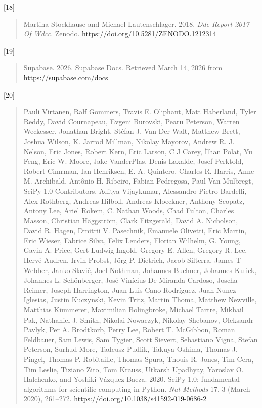 {[}18{]}

\begin{quote}
Martina Stockhause and Michael Lautenschlager. 2018. \emph{Ddc Report 2017 Of Wdcc}. Zenodo. \url{https://doi.org/10.5281/ZENODO.1212314}
\end{quote}

{[}19{]}

\begin{quote}
Supabase. 2026. Supabase Docs. Retrieved March 14, 2026 from \url{https://supabase.com/docs}
\end{quote}

{[}20{]}

\begin{quote}
Pauli Virtanen, Ralf Gommers, Travis E. Oliphant, Matt Haberland, Tyler Reddy, David Cournapeau, Evgeni Burovski, Pearu Peterson, Warren Weckesser, Jonathan Bright, Stéfan J. Van Der Walt, Matthew Brett, Joshua Wilson, K. Jarrod Millman, Nikolay Mayorov, Andrew R. J. Nelson, Eric Jones, Robert Kern, Eric Larson, C J Carey, İlhan Polat, Yu Feng, Eric W. Moore, Jake VanderPlas, Denis Laxalde, Josef Perktold, Robert Cimrman, Ian Henriksen, E. A. Quintero, Charles R. Harris, Anne M. Archibald, Antônio H. Ribeiro, Fabian Pedregosa, Paul Van Mulbregt, SciPy 1.0 Contributors, Aditya Vijaykumar, Alessandro Pietro Bardelli, Alex Rothberg, Andreas Hilboll, Andreas Kloeckner, Anthony Scopatz, Antony Lee, Ariel Rokem, C. Nathan Woods, Chad Fulton, Charles Masson, Christian Häggström, Clark Fitzgerald, David A. Nicholson, David R. Hagen, Dmitrii V. Pasechnik, Emanuele Olivetti, Eric Martin, Eric Wieser, Fabrice Silva, Felix Lenders, Florian Wilhelm, G. Young, Gavin A. Price, Gert-Ludwig Ingold, Gregory E. Allen, Gregory R. Lee, Hervé Audren, Irvin Probst, Jörg P. Dietrich, Jacob Silterra, James T Webber, Janko Slavič, Joel Nothman, Johannes Buchner, Johannes Kulick, Johannes L. Schönberger, José Vinícius De Miranda Cardoso, Joscha Reimer, Joseph Harrington, Juan Luis Cano Rodríguez, Juan Nunez-Iglesias, Justin Kuczynski, Kevin Tritz, Martin Thoma, Matthew Newville, Matthias Kümmerer, Maximilian Bolingbroke, Michael Tartre, Mikhail Pak, Nathaniel J. Smith, Nikolai Nowaczyk, Nikolay Shebanov, Oleksandr Pavlyk, Per A. Brodtkorb, Perry Lee, Robert T. McGibbon, Roman Feldbauer, Sam Lewis, Sam Tygier, Scott Sievert, Sebastiano Vigna, Stefan Peterson, Surhud More, Tadeusz Pudlik, Takuya Oshima, Thomas J. Pingel, Thomas P. Robitaille, Thomas Spura, Thouis R. Jones, Tim Cera, Tim Leslie, Tiziano Zito, Tom Krauss, Utkarsh Upadhyay, Yaroslav O. Halchenko, and Yoshiki Vázquez-Baeza. 2020. SciPy 1.0: fundamental algorithms for scientific computing in Python. \emph{Nat Methods} 17, 3 (March 2020), 261--272. \url{https://doi.org/10.1038/s41592-019-0686-2}
\end{quote}

